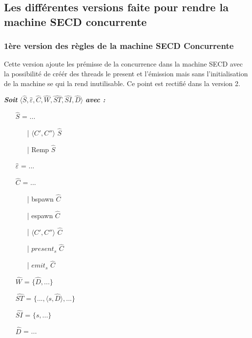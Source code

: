 \documentclass[10pt,a4paper]{article}
\begin{document}
			\subsection{Les différentes versions faite pour rendre la machine SECD concurrente}
				\subsubsection{1ère version des règles de la machine SECD Concurrente}\label{SECDConc1}
					\smallbreak
					Cette version ajoute les prémisse de la concurrence dans la machine SECD avec la possibilité de créér des threads le present et l'émission mais sans l'initialisation de la machine se qui la rend inutilisable. Ce point est rectifié dans la version 2.
					\bigbreak
					
					\textbf{\textit{Soit}} $\langle\widehat{S},\widehat{\varepsilon},\widehat{C},\widehat{W},\widehat{ST},\widehat{SI},\widehat{D}\rangle$ \textbf{\textit{avec :}}
					
					\begin{itemize}
						\item[] $\widehat{S}$ = ... 
						\begin{itemize}
							\item[|] $\langle C',C''\rangle$ $\widehat{S}$
							\item[|] Remp $\widehat{S}$
						\end{itemize}
						\item[] $\widehat{\varepsilon}$ = ... 
						\item[] $\widehat{C}$ = ... 
						\begin{itemize}
							\item[|] bspawn $\widehat{C}$ 
							\item[|] espawn $\widehat{C}$
							\item[|] $\langle C',C''\rangle$ $\widehat{C}$
							\item[|] $present_{s}$ $\widehat{C}$
							\item[|] $emit_{s}$ $\widehat{C}$ 
						\end{itemize}
						\item[] $\widehat{W}$ = $\{\widehat{D},...\}$
						\item[] $\widehat{ST}$ = $\{...,\langle s,\widehat{D}\rangle,...\}$
						\item[] $\widehat{SI}$ = $\{ s,...\}$
						\item[] $\widehat{D}$ = ...
					\end{itemize}
					\bigbreak
					\bigbreak
					
\end{document}
